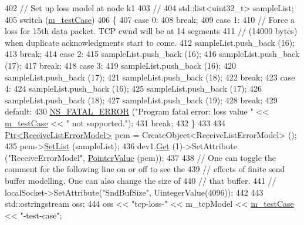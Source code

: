 \begin{DoxyCode}
402   \textcolor{comment}{// Set up loss model at node k1}
403   \textcolor{comment}{//}
404   std::list<uint32\_t> sampleList;
405   \textcolor{keywordflow}{switch} (\hyperlink{classNs3TcpLossTestCase_a7a8850910d9da65bebe441babd05f979}{m\_testCase})
406     \{
407     \textcolor{keywordflow}{case} 0:
408       \textcolor{keywordflow}{break};
409     \textcolor{keywordflow}{case} 1:
410       \textcolor{comment}{// Force a loss for 15th data packet. TCP cwnd will be at 14 segments}
411       \textcolor{comment}{// (14000 bytes) when duplicate acknowledgments start to come.}
412       sampleList.push\_back (16);
413       \textcolor{keywordflow}{break};
414     \textcolor{keywordflow}{case} 2:
415       sampleList.push\_back (16);
416       sampleList.push\_back (17);
417       \textcolor{keywordflow}{break};
418     \textcolor{keywordflow}{case} 3:
419       sampleList.push\_back (16);
420       sampleList.push\_back (17);
421       sampleList.push\_back (18);
422       \textcolor{keywordflow}{break};
423     \textcolor{keywordflow}{case} 4:
424       sampleList.push\_back (16);
425       sampleList.push\_back (17);
426       sampleList.push\_back (18);
427       sampleList.push\_back (19);
428       \textcolor{keywordflow}{break};
429     \textcolor{keywordflow}{default}:
430       \hyperlink{group__fatal_ga5131d5e3f75d7d4cbfd706ac456fdc85}{NS\_FATAL\_ERROR} (\textcolor{stringliteral}{"Program fatal error: loss value "} << 
      \hyperlink{classNs3TcpLossTestCase_a7a8850910d9da65bebe441babd05f979}{m\_testCase} << \textcolor{stringliteral}{" not supported."});
431       \textcolor{keywordflow}{break};
432     \}
433 
434   \hyperlink{classns3_1_1Ptr}{Ptr<ReceiveListErrorModel>} pem = CreateObject<ReceiveListErrorModel> ();
435   pem->\hyperlink{classns3_1_1ReceiveListErrorModel_ae710ec96d43c47bedb5d941351a4d809}{SetList} (sampleList);
436   dev1.\hyperlink{classns3_1_1NetDeviceContainer_a677d62594b5c9d2dea155cc5045f4d0b}{Get} (1)->SetAttribute (\textcolor{stringliteral}{"ReceiveErrorModel"}, \hyperlink{classns3_1_1PointerValue}{PointerValue} (pem));
437 
438   \textcolor{comment}{// One can toggle the comment for the following line on or off to see the}
439   \textcolor{comment}{// effects of finite send buffer modelling.  One can also change the size of}
440   \textcolor{comment}{// that buffer.}
441   \textcolor{comment}{// localSocket->SetAttribute("SndBufSize", UintegerValue(4096));}
442 
443   std::ostringstream oss;
444   oss << \textcolor{stringliteral}{"tcp-loss-"} << m\_tcpModel << \hyperlink{classNs3TcpLossTestCase_a7a8850910d9da65bebe441babd05f979}{m\_testCase} << \textcolor{stringliteral}{"-test-case"};

\end{DoxyCode}
